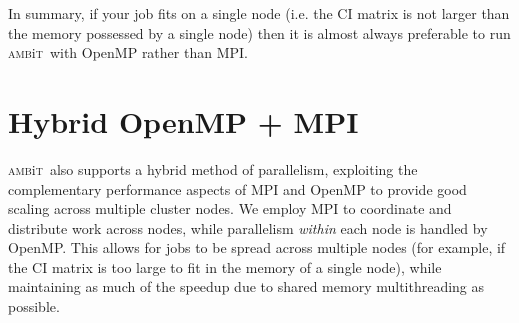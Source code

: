 \documentclass{report}
\newcommand{\ambit}{\textsc{amb}{\footnotesize i}\textsc{t}}
\begin{document}

In summary, if your job fits on a single node (i.e. the CI matrix is not larger than the 
memory possessed by a single node) then it is almost always preferable to run \ambit ~with OpenMP rather 
than MPI.

\section{Hybrid OpenMP + MPI}
\label{sec:hybrid}

\ambit ~also supports a hybrid method of parallelism, exploiting the complementary performance aspects of
MPI and OpenMP to provide good scaling across multiple cluster nodes. We employ MPI to coordinate and
distribute work across nodes, while parallelism \emph{within} each node is handled by OpenMP. This allows
for jobs to be spread across multiple nodes (for example, if the CI matrix is too large to fit in the
memory of a single node), while maintaining as much of the speedup due to shared memory multithreading as
possible. 
\end{document}

